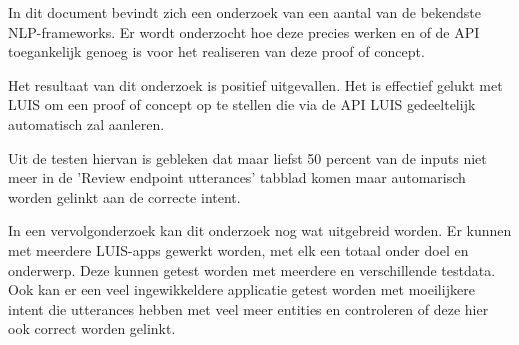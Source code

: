 In dit document bevindt zich een onderzoek van een aantal van de bekendste NLP-frameworks. Er wordt onderzocht hoe deze precies werken en of de API toegankelijk genoeg is voor het realiseren van deze proof of concept.

Het resultaat van dit onderzoek is positief uitgevallen. Het is effectief gelukt met LUIS om een proof of concept op te stellen die via de API LUIS gedeeltelijk automatisch zal aanleren.

Uit de testen hiervan is gebleken dat maar liefst 50 percent van de inputs niet meer in de 'Review endpoint utterances' tabblad komen maar automarisch worden gelinkt aan de correcte intent.

In een vervolgonderzoek kan dit onderzoek nog wat uitgebreid worden. Er kunnen met meerdere LUIS-apps gewerkt worden, met elk een totaal onder doel en onderwerp. Deze kunnen getest worden met meerdere en verschillende testdata. Ook kan er een veel ingewikkeldere applicatie getest worden met moeilijkere intent die utterances hebben met veel meer entities en controleren of deze hier ook correct worden gelinkt.